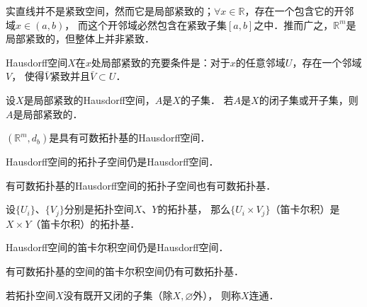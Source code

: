 实直线并不是紧致空间，然而它是局部紧致的；$\forall x\in \mathbb{R}$，存在一个包含它的开邻域$x\in (a,b)$，
而这个开邻域必然包含在紧致子集$[a,b]$之中．推而广之，$\mathbb{R}^m$是局部紧致的，但整体上并非紧致．

\begin{theorem}
    Hausdorff空间$X$在$x$处局部紧致的充要条件是：对于$x$的任意邻域$U$，存在一个邻域$V$，
    使得$\bar{V}$紧致并且$\bar{V}\subset U$．
\end{theorem}

\begin{proposition}
    设$X$是局部紧致的Hausdorff空间，$A$是$X$的子集．
    若$A$是$X$的闭子集或开子集，则$A$是局部紧致的．
\end{proposition}


\begin{proposition}
    $(\mathbb{R}^m, d_b)$是具有可数拓扑基的Hausdorff空间．
\end{proposition}

\begin{proposition}
    Hausdorff空间的拓扑子空间仍是Hausdorff空间．
\end{proposition}


\begin{proposition}\label{chtop:thm_hcb}
    有可数拓扑基的Hausdorff空间的拓扑子空间也有可数拓扑基．
\end{proposition}

\begin{proposition}
    设$\{U_i\}$、$\{V_j\}$分别是拓扑空间$X$、$Y$的拓扑基，
    那么$\{U_i\times V_j\}$（笛卡尔积）是$X\times Y$（笛卡尔积）的拓扑基．
\end{proposition}

\begin{proposition}\label{chtop:thm_cph}
    Hausdorff空间的笛卡尔积空间仍是Hausdorff空间．
\end{proposition}

\begin{proposition}
    有可数拓扑基的空间的笛卡尔积空间仍有可数拓扑基．
\end{proposition}




\begin{definition}\label{chtop:def_connection}
    若拓扑空间$X$没有既开又闭的子集（除$X,\varnothing$外），
    则称$X${\heiti 连通}．
\end{definition}

